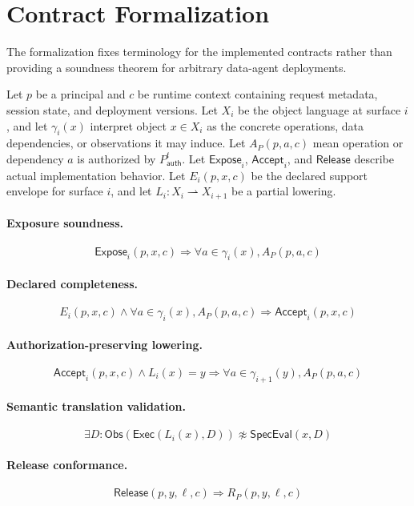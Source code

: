 \appendix

\section{Contract Formalization}
\label{app:formalization}

The formalization fixes terminology for the implemented contracts rather than providing a soundness theorem for arbitrary data-agent deployments.

Let $p$ be a principal and $c$ be runtime context containing request metadata, session state, and deployment versions. Let $X_i$ be the object language at surface $i$, and let $\gamma_i(x)$ interpret object $x \in X_i$ as the concrete operations, data dependencies, or observations it may induce. Let $A_P(p,a,c)$ mean operation or dependency $a$ is authorized by $P^t_{\mathsf{auth}}$. Let $\mathsf{Expose}_i$, $\mathsf{Accept}_i$, and $\mathsf{Release}$ describe actual implementation behavior. Let $E_i(p,x,c)$ be the declared support envelope for surface $i$, and let $L_i:X_i\rightharpoonup X_{i+1}$ be a partial lowering.

\paragraph{Exposure soundness.}
\[
\mathsf{Expose}_i(p,x,c) \Rightarrow \forall a \in \gamma_i(x), A_P(p,a,c)
\]

\paragraph{Declared completeness.}
\[
E_i(p,x,c) \wedge \forall a \in \gamma_i(x), A_P(p,a,c) \Rightarrow \mathsf{Accept}_i(p,x,c)
\]

\paragraph{Authorization-preserving lowering.}
\[
\mathsf{Accept}_i(p,x,c) \wedge L_i(x)=y
\Rightarrow
\forall a \in \gamma_{i+1}(y), A_P(p,a,c)
\]

\paragraph{Semantic translation validation.}
\[
\exists D: \mathsf{Obs}(\mathsf{Exec}(L_i(x),D)) \not\approx \mathsf{SpecEval}(x,D)
\]

\paragraph{Release conformance.}
\[
\mathsf{Release}(p,y,\ell,c) \Rightarrow R_P(p,y,\ell,c)
\]

